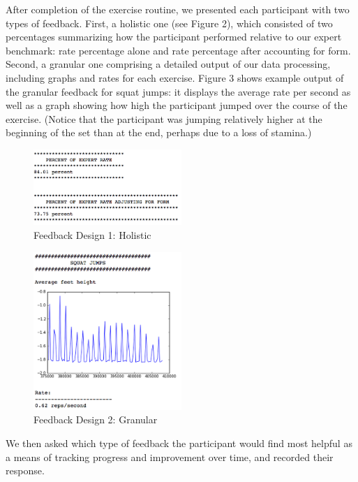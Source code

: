 After completion of the exercise routine, we presented each participant with two types of feedback. First, a holistic one (see Figure 2), which consisted of two percentages summarizing how the participant performed relative to our expert benchmark: rate percentage alone and rate percentage after accounting for form.  Second, a granular one comprising a detailed output of our data processing, including graphs and rates for each exercise. 
Figure 3 shows example output of the granular feedback for squat jumps: it displays the average rate per second as well as a graph 
showing how high the participant jumped over the course of the exercise. 
(Notice that the participant was jumping relatively higher at the beginning of the set than at the end, perhaps due to a loss of stamina.)
\begin{figure}[h!]
	\includegraphics[width=0.5\textwidth]{images/holistic}
\caption{Feedback Design 1: Holistic}
\end{figure}
\begin{figure}[h!]
	\includegraphics[width=0.5\textwidth]{images/granular}
\caption{Feedback Design 2: Granular}
\end{figure}
We then asked which type of feedback the participant would find most helpful as a means of tracking progress and improvement over time, and recorded their response. 
